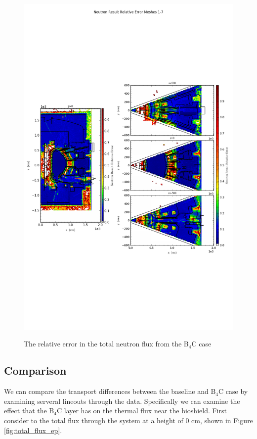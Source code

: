 \documentclass[12pt]{article}
\begin{document}
\begin{figure}[ht!]
  \centering
  \includegraphics[trim={0cm 9cm 0cm 10cm},clip,scale=0.75]{../plots/final_model_with_b4c/Neutron_Result_Relative_Error_Meshes_1-7.png}     
  \label{fig:neutrons_no4bc_relerr}
  \caption{The relative error in the total neutron flux from the B$_4$C case}
\end{figure}

\newpage
\clearpage
\subsection{Comparison}
We can compare the transport differences between the baseline and B$_4$C case 
by examining serveral lineouts through the data. Specifically we can examine
the effect that the B$_4$C layer has on the thermal flux near the bioshield. 
First consider to the total flux through the system at a height of 0 cm, shown
in Figure \ref{fig:total_flux_ep}. 
\end{document}
